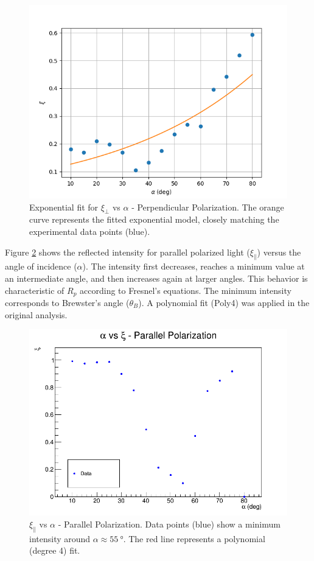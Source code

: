 \documentclass[journal]{IEEEtran}
\begin{document}
\begin{figure}[H]
    \centering
    \includegraphics[width=\linewidth]{../plots/exponential_fit.png}
    \caption{Exponential fit for $\xi_{\perp}$ vs $\alpha$ - Perpendicular Polarization. The orange curve represents the fitted exponential model, closely matching the experimental data points (blue).}
    \label{fig:exponential_fit}
\end{figure}
Figure \ref{fig:parallel} shows the reflected intensity for parallel polarized light ($\xi_{\parallel}$) versus the angle of incidence ($\alpha$). The intensity first decreases, reaches a minimum value at an intermediate angle, and then increases again at larger angles. This behavior is characteristic of $R_p$ according to Fresnel's equations. The minimum intensity corresponds to Brewster's angle ($\theta_B$). A polynomial fit (Poly4) was applied in the original analysis.
\begin{figure}[H]
    \centering
    \includegraphics[width=\linewidth]{../plots/parallel_plot.png}
    \caption{$\xi_{\parallel}$ vs $\alpha$ - Parallel Polarization. Data points (blue) show a minimum intensity around $\alpha \approx \SI{55}{\degree}$. The red line represents a polynomial (degree 4) fit.}
    \label{fig:parallel}
\end{figure}
\end{document}
